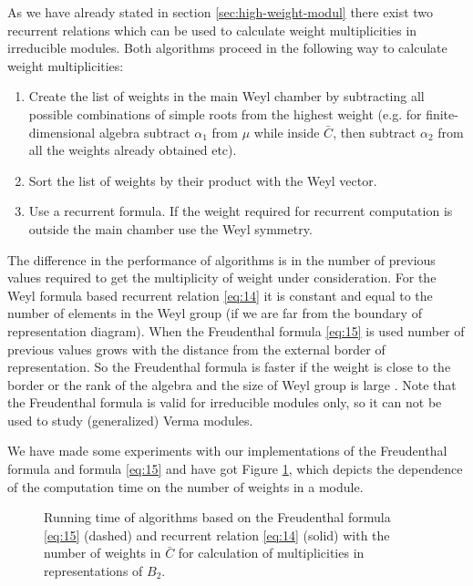 As we have already stated in section \ref{sec:high-weight-modul} there exist two recurrent relations which can be used to calculate weight multiplicities in irreducible modules. Both algorithms proceed in the following way to calculate weight multiplicities:
\begin{enumerate}
\item Create the list of weights in the main Weyl chamber by subtracting all possible combinations of simple roots from the highest weight (e.g. for finite-dimensional algebra subtract $\alpha_{1}$ from $\mu$ while inside $\bar C$, then subtract $\alpha_{2}$ from all the weights already obtained etc).
\item Sort the list of weights by their product with the Weyl vector.
\item Use a recurrent formula. If the weight required for recurrent computation is outside the main chamber use the Weyl symmetry.
\end{enumerate}
The difference in the performance of algorithms is in the number of previous values required to get the multiplicity of weight under consideration. For  the Weyl formula based recurrent relation \eqref{eq:14} it is constant and equal to the number of elements in the Weyl group (if we are far from the boundary of representation diagram). When the Freudenthal formula \eqref{eq:15} is used number of previous values grows with the distance from the external border of representation. So the Freudenthal formula is faster if the weight is close to the border or the rank of the algebra and the size of Weyl group is large \cite{moody1982fast}.
Note that the Freudenthal formula is valid for irreducible modules only, so it can not be used to study (generalized) Verma modules.

We have made some experiments with our implementations of the Freudenthal formula and formula \eqref{eq:15} and have got Figure  \ref{fig:freudenthal-racah-times}, which depicts the dependence of the computation time on the number of weights in a module.

\begin{figure}[h]
  \noindent{}
  \caption{Running time of algorithms based on the Freudenthal formula \eqref{eq:15} (dashed) and recurrent relation \eqref{eq:14} (solid) with the number of weights in $\bar C$ for calculation of multiplicities in representations of $B_{2}$.}
\label{fig:freudenthal-racah-times}

\end{figure}

